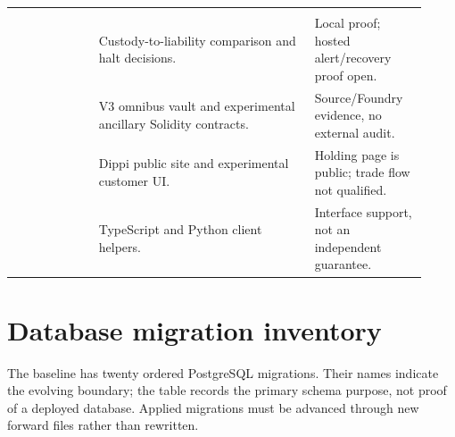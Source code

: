 \documentclass[envcountsame,runningheads,notitlepage]{llncs}
\newcommand{\pathref}[1]{\texttt{\detokenize{#1}}}
\begin{document}
\begin{longtable}{p{0.19\linewidth}p{0.48\linewidth}p{0.25\linewidth}}
\shortstack[l]{\pathref{reconciliation-}\\\pathref{worker}} & Custody-to-liability comparison and halt decisions. & Local proof; hosted alert/recovery proof open. \\
\pathref{contracts} & V3 omnibus vault and experimental ancillary Solidity contracts. & Source/Foundry evidence, no external audit. \\
\pathref{frontend} & Dippi public site and experimental customer UI. & Holding page is public; trade flow not qualified. \\
\pathref{sdk} & TypeScript and Python client helpers. & Interface support, not an independent guarantee. \\
\bottomrule
\end{longtable}
\normalsize

\section{Database migration inventory}
The baseline has twenty ordered PostgreSQL migrations. Their names indicate the evolving boundary; the table records the primary schema purpose, not proof of a deployed database. Applied migrations must be advanced through new forward files rather than rewritten.\cite{source}
\small
\end{document}
